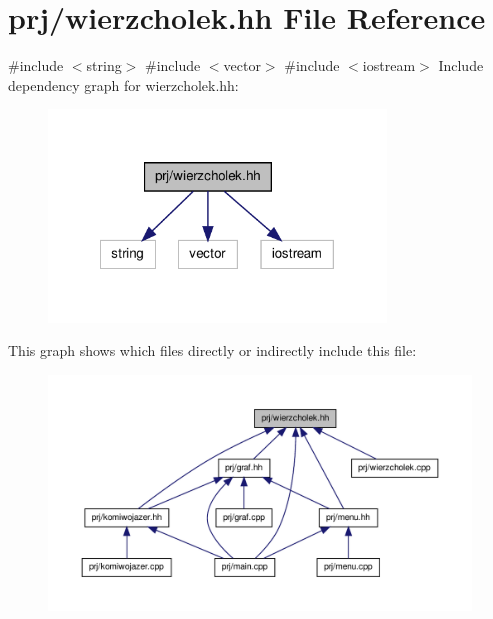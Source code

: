 \hypertarget{wierzcholek_8hh}{\section{prj/wierzcholek.hh \-File \-Reference}
\label{wierzcholek_8hh}
}
{\ttfamily \#include $<$string$>$}\*
{\ttfamily \#include $<$vector$>$}\*
{\ttfamily \#include $<$iostream$>$}\*
\-Include dependency graph for wierzcholek.\-hh\-:\nopagebreak
\begin{figure}[H]
\begin{center}
\leavevmode
\includegraphics[width=254pt]{wierzcholek_8hh__incl}
\end{center}
\end{figure}
\-This graph shows which files directly or indirectly include this file\-:
\nopagebreak
\begin{figure}[H]
\begin{center}
\leavevmode
\includegraphics[width=350pt]{wierzcholek_8hh__dep__incl}
\end{center}
\end{figure}
